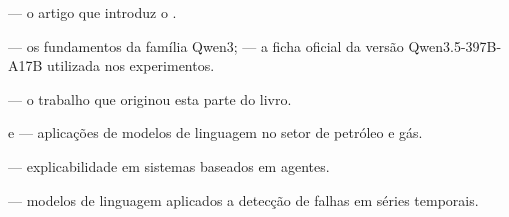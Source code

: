 \begin{leituras}
\item \citet{Vaswani2017} --- o artigo que introduz o .
\item \citet{Qwen2025} --- os fundamentos da família Qwen3; \citet{Qwen35_2026} --- a
      ficha oficial da versão Qwen3.5-397B-A17B utilizada nos experimentos.
\item \citet{Lopes2026LLM} --- o trabalho que originou esta parte do livro.
\item \citet{Liu2024oilgasLLM} e \citet{Chebbi2025energygpt} --- aplicações de modelos de
      linguagem no setor de petróleo e gás.
\item \citet{Sharma2025xaiagents} --- explicabilidade em sistemas baseados em agentes.
\item \citet{Zhang2025LLMTSFD} --- modelos de linguagem aplicados a detecção de falhas em
      séries temporais.
\end{leituras}
